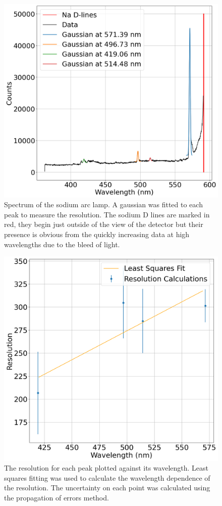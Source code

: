 \documentclass[a4paper,12pt,twocolumn]{article}
\begin{document}
		\begin{figure}
			\includegraphics[width=\columnwidth]{sodiumSpectrum.png}
			\captionsetup{font=scriptsize}
			\caption{Spectrum of the sodium arc lamp. A gaussian was fitted to each peak to measure the resolution. The sodium D lines are marked in red, they begin just outside of the view of the detector but their presence is obvious from the quickly increasing data at high wavelengths due to the bleed of light.}
			\label{fig:sodiumSpectrum}
		\end{figure}
	
		\begin{figure}
			\includegraphics[width=\columnwidth]{resolutions.png}
			\captionsetup{font=scriptsize}
			\caption{The resolution for each peak plotted against its wavelength. Least squares fitting was used to calculate the wavelength dependence of the resolution. The uncertainty on each point was calculated using the propagation of errors method.}
			\label{fig:resolution}
		\end{figure}
	
\end{document}

